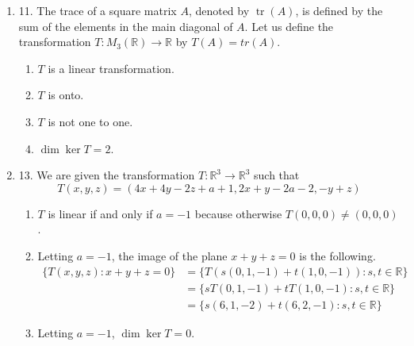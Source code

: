 \documentclass{article}
\newenvironment{answers}{ %
	\begin{enumerate}
		\setlength{\itemsep}{\bigskipamount}
}{\end{enumerate}}
\newcommand{\R}{\mathbb{R}}
\newcommand{\tr}{\operatorname{tr}}
\begin{document}
\begin{answers}
\begin{enumerate}
				For \(T\) to meet these constraints, the following must hold true.
				\begin{equation*}
					\forall s,t \in \R,\ T((2,2,1) + s(1,1,1) + t(1,4,0)) = (0,3,1)
				\end{equation*}
				By linearity of \(T\), we can then say the following.
				\begin{equation*}
					\forall s,t \in \R,\ T(2,2,1) + s + tT(1,4,0) = (0,3,1)
				\end{equation*}
				Yet this can only be true if \(T(1,1,1) = T(1,4,0) = (0,0,0)\) and \(T(2,2,1) = (0,3,1)\).

				Thus we have defined \(T\) on three vectors in \(\R^3\), and these form a basis over \(\R^3\), since there are as many of them as the dimension and they are independent. Hence we conclude that \(T\) is indeed unique.
		\end{enumerate}

	\item[11.]
		The trace of a square matrix \(A\), denoted by \(\tr(A)\), is defined by the sum of the elements in the main diagonal of \(A\). Let us define the transformation \(T : M_3(\R) \to \R\) by \(T(A) = tr(A)\).
		\begin{enumerate}
			\item \(T\) is a linear transformation.
			\item \(T\) is onto.
			\item \(T\) is not one to one.
			\item \(\dim \ker T = 2\).
		\end{enumerate}

	\item[13.]
		We are given the transformation \(T : \R^3 \to \R^3\) such that
		\begin{equation*}
			T(x,y,z) = (4x + 4y -2z + a + 1, 2x + y - 2a - 2, -y + z)
		\end{equation*}
		\begin{enumerate}
			\item
				\(T\) is linear if and only if \(a = -1\) because otherwise \(T(0,0,0) \neq (0,0,0)\).
			\item
				Letting \(a = -1\), the image of the plane \(x+y+z=0\) is the following.
				\begin{align*}
					\{T(x,y,z) : x + y + z = 0\} & = \{T(s(0,1,-1) + t(1,0,-1)) : s,t \in \R\} \\
					                             & = \{sT(0,1,-1) + tT(1,0,-1) : s,t \in \R\} \\
					                             & = \{s(6,1,-2) + t(6,2,-1) : s,t \in \R\}
				\end{align*}
			\item
				Letting \(a = -1\), \(\dim \ker T = 0\).
		\end{enumerate}
\end{answers}
\end{document}
